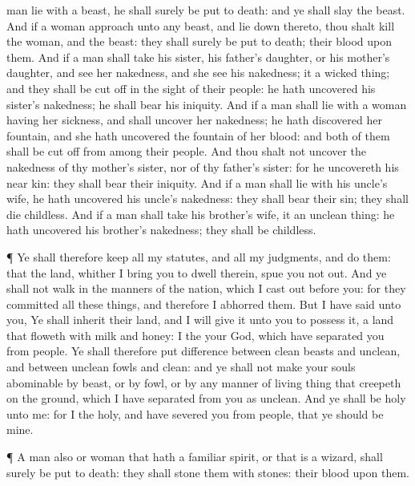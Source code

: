 {man
lie with a
beast, he shall
surely be put to
death: and ye shall
slay the
beast.
And if a
woman
approach unto any
beast, and lie
down thereto, thou shalt
kill the
woman, and the
beast: they shall
surely be put to
death; their
blood
{} upon them.
And if a
man shall
take his
sister, his
father’s
daughter,
or his
mother’s
daughter, and
see her
nakedness, and she
see his
nakedness; it
{} a wicked
thing; and they shall be cut
off in the
sight of their
people: he hath
uncovered his
sister’s
nakedness; he shall
bear his
iniquity.
And if a
man shall
lie with a
woman having her
sickness, and shall
uncover her
nakedness; he hath
discovered her
fountain, and she hath
uncovered the
fountain of her
blood: and
both of them shall be cut
off from
among their
people.
And thou shalt not
uncover the
nakedness of thy
mother’s
sister, nor of thy
father’s
sister: for he
uncovereth his near
kin: they shall
bear their
iniquity.
And if a
man shall
lie with his
uncle’s wife, he hath
uncovered his
uncle’s
nakedness: they shall
bear their
sin; they shall
die
childless.
And if a
man shall
take his
brother’s
wife, it
{} an unclean
thing: he hath
uncovered his
brother’s
nakedness; they shall be
childless.
\par }{\PP {}¶ Ye shall therefore
keep all my
statutes, and all my
judgments, and
do them: that the
land, whither I
bring you to
dwell therein, spue you not
out.
And ye shall not
walk in the
manners of the
nation, which I cast
out
before you: for they
committed all these things, and therefore I
abhorred them.
But I have
said unto you, Ye shall
inherit their
land, and I will
give it unto you to
possess it, a
land that
floweth with
milk and
honey: I
{} the
{} your
God, which have
separated you from
{}
people.
Ye shall therefore put
difference between
clean
beasts and
unclean, and between
unclean
fowls and
clean: and ye shall not make your
souls
abominable by
beast, or by
fowl, or by any manner of living thing that
creepeth on the
ground, which I have
separated from you as
unclean.
And ye shall be
holy unto me: for I the
{}
{}
holy, and have
severed you from
{}
people, that ye should be mine.
\par }{\PP {}¶ A
man also or
woman that
hath a familiar
spirit, or that is a
wizard, shall
surely be put to
death: they shall
stone them with
stones: their
blood
{} upon them.

}
